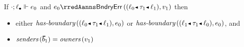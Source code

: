 \begin{theorem}\label{A-correct-blame}
  If\/ $\cdot; \ell_{\bullet} \Vdash e_0$ and\/
      \(\sexpr_0
        \rredAanns  \boundaryerror{\obnd{\sowner_0}{\stype_1}{\sowner_1}}{\svalue_1}\)
          then
          \begin{itemize}
            \item
              either\/ $\fhasbnd{\obnd{\sowner_0}{\stype_1}{\sowner_1}}{\sexpr_0}$
              or\/
              $\fhasbnd{\obnd{\sowner_1}{\stype_1}{\sowner_0}}{\sexpr_0}$,
              and
             \item $\fblistsenders{\sblist_1}=  \fvalueowners{\svalue_1}$
          \end{itemize}
\end{theorem}

{\newcommand{\Abcbeo}{$\sexpr_0 \rredAanns \ctx_0[\edynb{\obnd{\sowner_1}{\stype_1}{\sowner_2}}{\svalue_1}] \credAanns \boundaryerror{\sblist_1}{\svalue_1}$}
\newcommand{\Abcitems}{%
  \begin{enumerate}
    \item
      \(\forall\,\sbnd_1 \in \sblist_1\),  either\/ \(\fhasbnd{\sexpr_0}{\sbnd_1}\) or \(\fhasbnd{\sexpr_0}{\fflip{\sbnd_1}}\)
    \item
      one of the following holds:
      \begin{enumerate}
        \item
          $\svalue_1 \not\in (\ehist{\sblist}{\obbars{\svalue}{\sownerlist}})$
          and\/ $\snil; \sowner_2 \sWLA \svalue_1$
        \item
          $\svalue_1 \eeq (\ehist{\sblist_2}{\obbars{\svalue_2}{\sownerlist_2\sowner_2}})$
          and\/ $\fbndeqowners{\sblist_2}{\fconcat{\sowner_2}{\sownerlist_2\sowner_2}}$
          and\/ $\snil; \flast{\sowner_3} \sWLA \svalue_2$
      \end{enumerate}
  \end{enumerate}}

}
